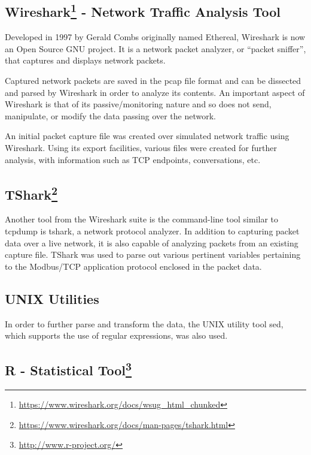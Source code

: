 \documentclass[12pt,]{article}
\let\rmarkdownfootnote\footnote%
\def\footnote{\protect\rmarkdownfootnote}
\begin{document}
\subsection[Wireshark - Network Traffic Analysis
Tool]{Wireshark\footnote{\url{https://www.wireshark.org/docs/wsug_html_chunked}}
- Network Traffic Analysis
Tool}\label{wireshark2---network-traffic-analysis-tool}

Developed in 1997 by Gerald Combs originally named Ethereal, Wireshark
is now an Open Source GNU project. It is a network packet analyzer, or
``packet sniffer'', that captures and displays network packets.

Captured network packets are saved in the pcap file format and can be
dissected and parsed by Wireshark in order to analyze its contents. An
important aspect of Wireshark is that of its passive/monitoring nature
and so does not send, manipulate, or modify the data passing over the
network.

An initial packet capture file was created over simulated network
traffic using Wireshark. Using its export facilities, various files were
created for further analysis, with information such as TCP endpoints,
conversations, etc.

\subsection[TShark]{TShark\footnote{\url{https://www.wireshark.org/docs/man-pages/tshark.html}}}\label{tshark3}

Another tool from the Wireshark suite is the command-line tool similar
to tcpdump is tshark, a network protocol analyzer. In addition to
capturing packet data over a live network, it is also capable of
analyzing packets from an existing capture file. TShark was used to
parse out various pertinent variables pertaining to the Modbus/TCP
application protocol enclosed in the packet data.

\subsection{UNIX Utilities}\label{unix-utilities}

In order to further parse and transform the data, the UNIX utility tool
sed, which supports the use of regular expressions, was also used.

\subsection[R - Statistical Tool]{R - Statistical Tool\footnote{\url{http://www.r-project.org/}}}\label{r---statistical-tool4}
\end{document}
